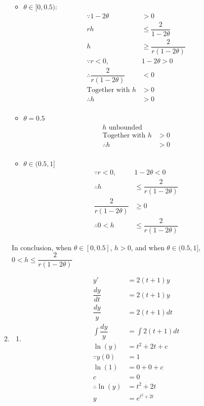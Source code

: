 \documentclass{article}
\begin{document}
\begin{enumerate}
\begin{itemize}
\item $\theta \in [0,0.5):$
\begin{align*}
\because 1-2\theta&>0\\
rh&\leq \dfrac{2}{1-2\theta}\\
h&\geq \dfrac{2}{r(1-2\theta)}\\
\because r < 0,& 1-2\theta>0\\
\therefore \dfrac{2}{r(1-2\theta)}&<0\\
\text{Together with } h&>0\\
\therefore h&> 0\\
\end{align*}
\item $\theta=0.5$
\begin{align*}
h \text{ unbounded}\\ \text{Together with } h&> 0\\
\therefore h&>0\\
\end{align*}
\item
$\theta \in (0.5,1]$
\begin{align*}
\because r < 0,& 1-2\theta <0\\
\therefore h&\leq \dfrac{2}{r(1-2\theta)}\\
\dfrac{2}{r(1-2\theta)}&\geq 0\\
\therefore 0< h&\leq \dfrac{2}{r(1-2\theta)}
\end{align*}
\end{itemize}

In conclusion, when $\theta \in [0,0.5]$, $h> 0$, and when $\theta \in (0.5,1]$, $0< h\leq \dfrac{2}{r(1-2\theta)}$
\item
\begin{enumerate}
\item
\begin{align*}
y'&= 2(t+1)y\\
\dfrac{dy}{dt} &= 2(t+1)y\\
\dfrac{dy}{y}&= 2(t+1)dt\\
\int \dfrac{dy}{y}&=\int 2(t+1)dt\\
\ln (y) &= t^2+2t+c\\
\because y(0)&=1\\
\ln(1) &= 0+0+c\\
c&=0\\
\therefore \ln (y) &= t^2+2t\\
y&=e^{t^2+2t}
\end{align*}


\end{enumerate}
\end{enumerate}
\end{document}

